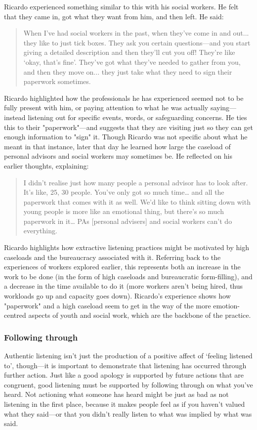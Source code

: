 Ricardo experienced something similar to this with his social workers. He felt that they came in, got what they want from him, and then left. He said:
\begin{quote}
When I've had social workers in the past, when they've come in and out... they like to just tick boxes. They ask you certain questions—and you start giving a detailed description and then they'll cut you off! They're like `okay, that's fine'. They've got what they've needed to gather from you, and then they move on... they just take what they need to sign their paperwork sometimes.
\end{quote}
Ricardo highlighted how the professionals he has experienced seemed not to be fully present with him, or paying attention to what he was actually saying—instead listening out for specific events, words, or safeguarding concerns. He ties this to their "paperwork"—and suggests that they are visiting just so they can get enough information to "sign" it. Though Ricardo was not specific about what he meant in that instance, later that day he learned how large the caseload of personal advisors and social workers may sometimes be. He reflected on his earlier thoughts, explaining:
\begin{quote}
I didn’t realise just how many people a personal advisor has to look after. It’s like, 25, 30 people. You’ve only got so much time… and all the paperwork that comes with it as well. We’d like to think sitting down with young people is more like an emotional thing, but there’s so much paperwork in it… PAs [personal advisers] and social workers can’t do everything.
\end{quote}
Ricardo highlights how extractive listening practices might be motivated by high caseloads and the bureaucracy associated with it. Referring back to the experiences of workers explored earlier, this represents both an increase in the work to be done (in the form of high caseloads and bureaucratic form-filling), and a decrease in the time available to do it (more workers aren’t being hired, thus workloads go up and capacity goes down). Ricardo's experience shows how "paperwork" and a high caseload seem to get in the way of the more emotion-centred aspects of youth and social work, which are the backbone of the practice. 

\subsubsection{Following through}
Authentic listening isn’t just the production of a positive affect of ‘feeling listened to’, though—it is important to demonstrate that listening has occurred through further action. Just like a good apology is supported by future actions that are congruent, good listening must be supported by following through on what you’ve heard. Not actioning what someone has heard might be just as bad as not listening in the first place, because it makes people feel as if you haven't valued what they said—or that you didn't really listen to what was implied by what was said.

